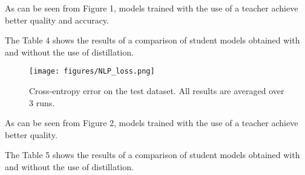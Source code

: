 \documentclass[12pt]{article}
\begin{document}
As can be seen from Figure 1, models trained with the use of a teacher achieve better quality and accuracy.


\begin{table}[h!t]
\begin{center}
\caption{Model quality for CV}
\label{table_4}
\end{center}
\end{table}

The Table 4 shows the results of a comparison of student models obtained with and without the use of distillation.


\begin{figure}[h!t]\center
{\texttt{[image: figures/NLP\_loss.png]}}
\caption{Cross-entropy error on the test dataset. All results are averaged over 3 runs.}
\end{figure}

As can be seen from Figure 2, models trained with the use of a teacher achieve better quality.

The Table 5 shows the results of a comparison of student models obtained with and without the use of distillation.
\end{document}
